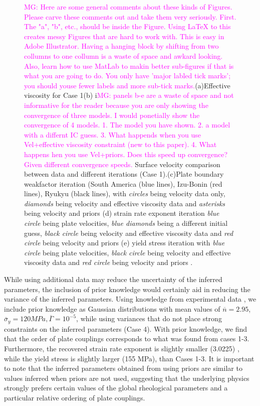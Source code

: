 \documentclass[12pt]{article}
\newcommand{\mgnote}[1]{\textcolor{magenta}{MG: #1}}
\begin{document}
\begin{figure}[H]
\caption{\mgnote{Here are some general comments about these kinds of Figures. Please carve these comments out and take them very seriously. First. The "a", "b", etc., should be inside the Figure. Using LaTeX to this creates messy Figures that are hard to work with. This is easy in Adobe Illustrator. Having a hanging block by shifting from two collumns to one collumn is a waste of space and awkard looking. Also, learn how to use MatLab to makin better sub-figures if that is what you are going to do. You only have 'major labled tick marks'; you should youse fewer labels and more sub-tick marks.}(a)Effective viscosity for Case 1(b) i\mgnote{ panels b-e are a waste of space and not informative for the reader because you are only showing the convergence of three models. I would ponetially show the convergence of 4 models. 1. The model you have shown. 2. a model with a differnt IC guess. 3. What happends when you use Vel+effective viscosity constraint (new to this paper). 4. What happens hen you use Vel+priors. Does this speed up convergence? Given different convergence speeds. }Surface velocity comparison between data and different iterations (Case 1).(c)Plate boundary weakfactor iteration (South America (blue lines), Izu-Bonin (red lines), Ryukyu (black lines), with \textit{circles} being velocity data only, \textit{diamonds} being velocity and effective viscosity data and \textit{asterisks} being velocity and priors  (d) strain rate exponent iteration \textit{blue circle} being plate velocities, \textit{blue diamonds} being a different initial guess, \textit{black circle} being velocity and effective viscosity data and \textit{red circle} being velocity and priors (e) yield stress iteration with \textit{blue circle} being plate velocities, \textit{black circle} being velocity and effective viscosity data and \textit{red circle} being velocity and priors .}
\label{fig:inverse1}
\end{figure}

While using additional data may reduce the uncertainty of the inferred parameters, the inclusion of prior knowledge would certainly aid in reducing the variance of the inferred parameters. Using knowledge from experimental data \citep{korenaga2008new}, we include prior knowledge as Gaussian distributions with mean values of $\overline{n}=2.95$,$\overline{\sigma}_y = 120 MPa, \overline{\Gamma}=10^{-5}$, while using variances that do not place strong constraints on the inferred parameters (Case 4). 
 With prior knowledge, we find that the order of plate couplings corresponds to what was found from cases 1-3. Furthermore, the recovered strain rate exponent is slightly smaller (3.0225) , while the yield stress is slightly larger (155 MPa), than Cases 1-3. It is important to note that the inferred parameters obtained from using priors are similar to values inferred when priors are not used, suggesting that the underlying physics strongly prefers certain values of the global rheological parameters and a particular relative ordering of plate couplings.
\end{document}
